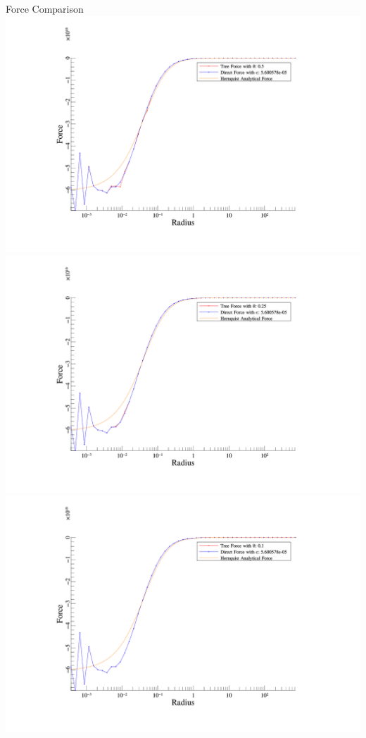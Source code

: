 \begin{frame}[allowframebreaks]{Force Comparison}
	\includegraphics[width=\textwidth]{figures/plots/tree_force_0.5.png}
	\includegraphics[width=\textwidth]{figures/plots/tree_force_0.25.png}
	\includegraphics[width=\textwidth]{figures/plots/tree_force_0.1.png}
\end{frame}
